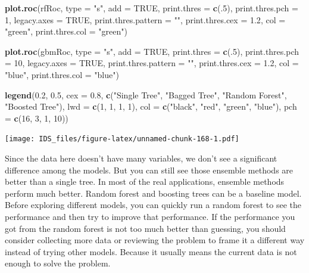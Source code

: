 \documentclass[12pt,]{krantz}
\makeatletter
\newenvironment{Shaded}{\begin{snugshade}}{\end{snugshade}}
\newcommand{\DataTypeTok}[1]{\textcolor[rgb]{0.27,0.27,0.27}{#1}}
\newcommand{\DecValTok}[1]{\textcolor[rgb]{0.06,0.06,0.06}{#1}}
\newcommand{\FloatTok}[1]{\textcolor[rgb]{0.06,0.06,0.06}{#1}}
\newcommand{\KeywordTok}[1]{\textcolor[rgb]{0.27,0.27,0.27}{\textbf{#1}}}
\newcommand{\NormalTok}[1]{#1}
\newcommand{\OtherTok}[1]{\textcolor[rgb]{0.37,0.37,0.37}{#1}}
\newcommand{\StringTok}[1]{\textcolor[rgb]{0.5,0.5,0.5}{#1}}
\newenvironment{kframe}{%
\medskip{}
\setlength{\fboxsep}{.8em}
 \def\at@end@of@kframe{}%
 \ifinner\ifhmode%
  \def\at@end@of@kframe{\end{minipage}}%
  \begin{minipage}{\columnwidth}%
 \fi\fi%
 \def\FrameCommand##1{\hskip\@totalleftmargin \hskip-\fboxsep
 \colorbox{shadecolor}{##1}\hskip-\fboxsep
     \hskip-\linewidth \hskip-\@totalleftmargin \hskip\columnwidth}%
 \MakeFramed {\advance\hsize-\width
   \@totalleftmargin\z@ \linewidth\hsize
   \@setminipage}}%
 {\par\unskip\endMakeFramed%
 \at@end@of@kframe}
\renewenvironment{Shaded}{\begin{kframe}}{\end{kframe}}
\makeatother
\begin{document}
\begin{Shaded}
\begin{Highlighting}[]
\KeywordTok{plot.roc}\NormalTok{(rfRoc, }
     \DataTypeTok{type =} \StringTok{"s"}\NormalTok{, }
     \DataTypeTok{add =} \OtherTok{TRUE}\NormalTok{, }
     \DataTypeTok{print.thres =} \KeywordTok{c}\NormalTok{(.}\DecValTok{5}\NormalTok{), }\DataTypeTok{print.thres.pch =} \DecValTok{1}\NormalTok{, }
     \DataTypeTok{legacy.axes =} \OtherTok{TRUE}\NormalTok{, }\DataTypeTok{print.thres.pattern =} \StringTok{""}\NormalTok{, }
     \DataTypeTok{print.thres.cex =} \FloatTok{1.2}\NormalTok{,}
     \DataTypeTok{col =} \StringTok{"green"}\NormalTok{, }\DataTypeTok{print.thres.col =} \StringTok{"green"}\NormalTok{)}

\KeywordTok{plot.roc}\NormalTok{(gbmRoc, }
     \DataTypeTok{type =} \StringTok{"s"}\NormalTok{, }
     \DataTypeTok{add =} \OtherTok{TRUE}\NormalTok{, }
     \DataTypeTok{print.thres =} \KeywordTok{c}\NormalTok{(.}\DecValTok{5}\NormalTok{), }\DataTypeTok{print.thres.pch =} \DecValTok{10}\NormalTok{, }
     \DataTypeTok{legacy.axes =} \OtherTok{TRUE}\NormalTok{, }\DataTypeTok{print.thres.pattern =} \StringTok{""}\NormalTok{, }
     \DataTypeTok{print.thres.cex =} \FloatTok{1.2}\NormalTok{,}
     \DataTypeTok{col =} \StringTok{"blue"}\NormalTok{, }\DataTypeTok{print.thres.col =} \StringTok{"blue"}\NormalTok{)}

\KeywordTok{legend}\NormalTok{(}\FloatTok{0.2}\NormalTok{, }\FloatTok{0.5}\NormalTok{, }\DataTypeTok{cex =} \FloatTok{0.8}\NormalTok{,}
       \KeywordTok{c}\NormalTok{(}\StringTok{"Single Tree"}\NormalTok{, }\StringTok{"Bagged Tree"}\NormalTok{, }
         \StringTok{"Random Forest"}\NormalTok{, }\StringTok{"Boosted Tree"}\NormalTok{),}
       \DataTypeTok{lwd =} \KeywordTok{c}\NormalTok{(}\DecValTok{1}\NormalTok{, }\DecValTok{1}\NormalTok{, }\DecValTok{1}\NormalTok{, }\DecValTok{1}\NormalTok{),}
       \DataTypeTok{col =} \KeywordTok{c}\NormalTok{(}\StringTok{"black"}\NormalTok{, }\StringTok{"red"}\NormalTok{, }\StringTok{"green"}\NormalTok{, }\StringTok{"blue"}\NormalTok{),}
       \DataTypeTok{pch =} \KeywordTok{c}\NormalTok{(}\DecValTok{16}\NormalTok{, }\DecValTok{3}\NormalTok{, }\DecValTok{1}\NormalTok{, }\DecValTok{10}\NormalTok{))}
\end{Highlighting}
\end{Shaded}

\texttt{[image: IDS\_files/figure-latex/unnamed-chunk-168-1.pdf]}

Since the data here doesn't have many variables, we don't see a significant difference among the models. But you can still see those ensemble methods are better than a single tree. In most of the real applications, ensemble methods perform much better. Random forest and boosting trees can be a baseline model. Before exploring different models, you can quickly run a random forest to see the performance and then try to improve that performance. If the performance you got from the random forest is not too much better than guessing, you should consider collecting more data or reviewing the problem to frame it a different way instead of trying other models. Because it usually means the current data is not enough to solve the problem.
\end{document}
